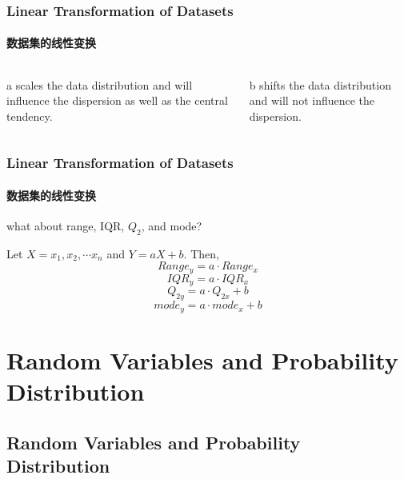 \documentclass[
	11pt, %
]{beamer}
\begin{document}


\begin{frame}
	\frametitle{Linear Transformation of Datasets}
	\framesubtitle{数据集的线性变换}
	\begin{columns}[t] 
		\begin{column}{0.45\textwidth} %
		\begin{definition}
			a scales the data distribution and will influence the dispersion as well as the central tendency.
		\end{definition}
		\end{column}
		\begin{column}{0.5\textwidth} %
		b shifts the data distribution and will not influence the dispersion.
		\end{column}
	\end{columns}
\end{frame}


\begin{frame}
	\frametitle{Linear Transformation of Datasets}
	\framesubtitle{数据集的线性变换}
	{\LARGE what about range, IQR, $Q_2$, and mode?}
	\pause
	\begin{theorem}
		Let $X = {x_1, x_2, \cdots x_n}$ and $Y = aX + b$. Then,
		$$Range_y = a \cdot Range_x$$ 
		$$IQR_y = a \cdot IQR_x$$
		$$Q_{2y} = a\cdot Q_{2x} + b$$
		$$mode_y = a\cdot mode_x + b $$
	\end{theorem}
\end{frame}



\section{Random Variables and Probability Distribution}


\subsection{Random Variables and Probability Distribution}

\end{document}
